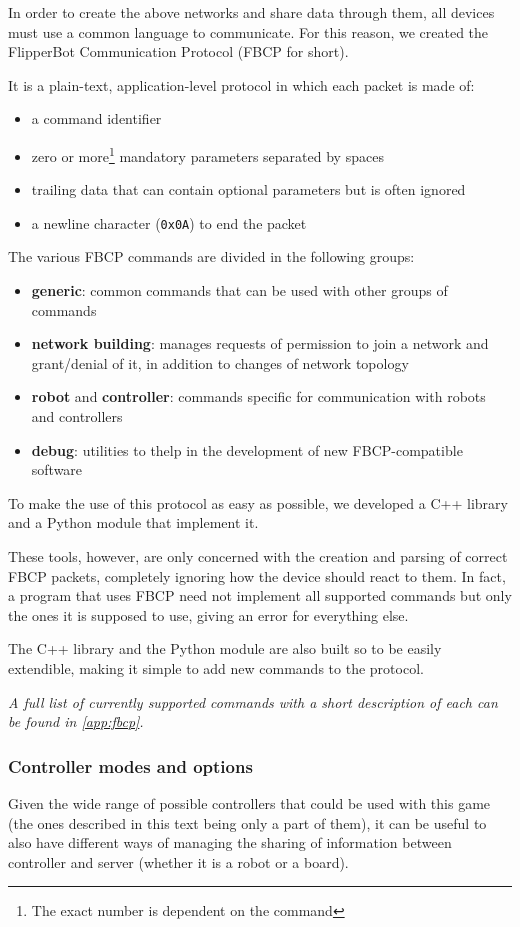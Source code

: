 In order to create the above networks and share data through them,
all devices must use a common language to communicate.
For this reason, we created the FlipperBot Communication Protocol
(FBCP for short).

\beforelist It is a plain-text, application-level protocol in which each packet
is made of:
\begin{itemize}
  \item a command identifier
  \item zero or more\footnote{The exact number is dependent on the
    command} mandatory parameters separated by spaces
  \item trailing data that can contain optional parameters but is
    often ignored
  \item a newline character (\texttt{0x0A}) to end the packet
\end{itemize}
\afterlist*
\beforelist The various FBCP commands are divided in the following groups:
\begin{itemize}
  \item \textbf{generic}: common commands that can be used with
    other groups of commands
  \item \textbf{network building}: manages requests of permission to
    join a network and grant/denial of it, in addition to changes of
    network topology
  \item \textbf{robot} and \textbf{controller}: commands specific
    for communication with robots and controllers
  \item \textbf{debug}: utilities to thelp in the development of new
    FBCP-compatible software
\end{itemize}
\afterlist*
To make the use of this protocol as easy as possible, we developed
a C++ library and a Python module that implement it.

These tools, however, are only concerned with the creation and
parsing of correct FBCP packets, completely ignoring how the device
should react to them. In fact, a program that uses FBCP need not
implement all supported commands but only the ones it is supposed to
use, giving an error for everything else.

The C++ library and the Python module are also built so to be easily
extendible, making it simple to add new commands to the protocol.

\textit{A full list of currently supported commands with a short
description of each can be found in \autoref{app:fbcp}.}

\subsubsection{Controller modes and options}
  \label{sssec:optmode}
  Given the wide range of possible controllers that could be used
  with this game (the ones described in this text being only a part
  of them), it can be useful to also have different ways of managing
  the sharing of information between controller and server (whether
  it is a robot or a board).


